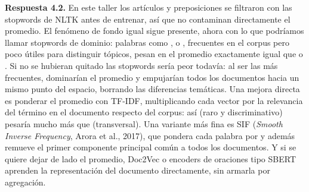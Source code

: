 \textbf{Respuesta 4.2.} En este taller los artículos y preposiciones se filtraron con las stopwords de NLTK antes de entrenar, así que no contaminan directamente el promedio. El fenómeno de fondo igual sigue presente, ahora con lo que podríamos llamar stopwords de dominio: palabras como ,  o , frecuentes en el corpus pero poco útiles para distinguir tópicos, pesan en el promedio exactamente igual que  o . Si no se hubieran quitado las stopwords sería peor todavía: al ser las más frecuentes, dominarían el promedio y empujarían todos los documentos hacia un mismo punto del espacio, borrando las diferencias temáticas. Una mejora directa es ponderar el promedio con TF-IDF, multiplicando cada vector por la relevancia del término en el documento respecto del corpus: así  (raro y discriminativo) pesaría mucho más que  (transversal). Una variante más fina es SIF (\textit{Smooth Inverse Frequency}, Arora et al., 2017), que pondera cada palabra por  y además remueve el primer componente principal común a todos los documentos. Y si se quiere dejar de lado el promedio, Doc2Vec o encoders de oraciones tipo SBERT aprenden la representación del documento directamente, sin armarla por agregación.
